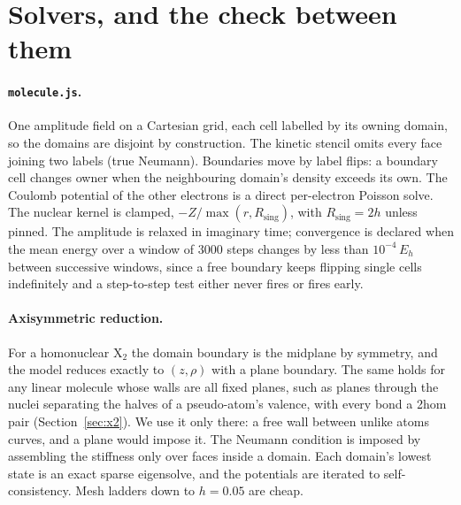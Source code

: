 \documentclass[11pt]{article}
\begin{document}
\section{Solvers, and the check between them}
\label{sec:solver}

\paragraph{\texttt{molecule.js}.} One amplitude field on a Cartesian grid, each cell labelled by its
owning domain, so the domains are disjoint by construction. The kinetic stencil omits every face
joining two labels (true Neumann). Boundaries move by label flips: a boundary cell changes owner
when the neighbouring domain's density exceeds its own. The Coulomb potential of the other
electrons is a direct per-electron Poisson solve. The nuclear kernel is clamped,
$-Z/\max(r, R_{\text{sing}})$, with $R_{\text{sing}} = 2h$ unless pinned. The amplitude is relaxed
in imaginary time; convergence is declared when the mean energy over a window of $3000$ steps
changes by less than $10^{-4}\,E_h$ between successive windows, since a free boundary keeps
flipping single cells indefinitely and a step-to-step test either never fires or fires early.

\paragraph{Axisymmetric reduction.} For a homonuclear X$_2$ the domain boundary is the midplane by
symmetry, and the model reduces exactly to $(z,\rho)$ with a plane boundary. The same holds for
any linear molecule whose walls are all fixed planes, such as planes through the nuclei separating
the halves of a pseudo-atom's valence, with every bond a 2hom pair (Section~\ref{sec:x2}). We use it
only there: a free wall between unlike atoms curves, and a plane would impose it. The
Neumann condition is imposed by assembling the stiffness only over faces inside a domain. Each
domain's lowest state is an exact sparse eigensolve, and the potentials are iterated to
self-consistency. Mesh ladders down to $h = 0.05$ are cheap.
\end{document}
